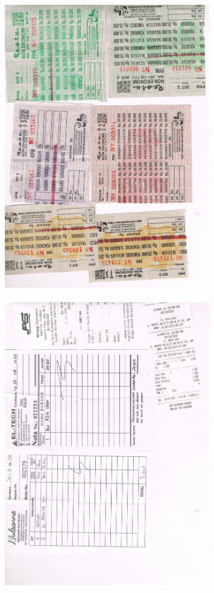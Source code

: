 \documentclass{article} %
\begin{document}
	\begin{figure}[H]
		\centering
		\includegraphics[width=0.8\textwidth]{images/bus_madiun}
	\end{figure}

	\begin{figure}[H]
		\centering
		\includegraphics[width=0.8\textwidth]{images/komponen0}
	\end{figure}
\end{document}
